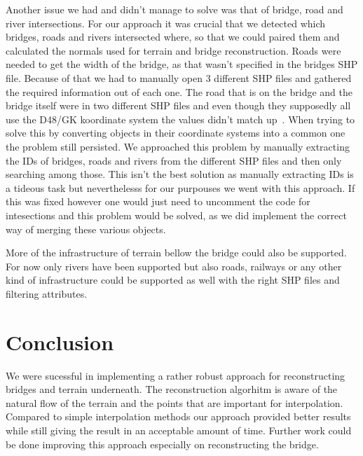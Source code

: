 \documentclass{egpubl-eurovis-star}
\begin{document}
Another issue we had and didn't manage to solve was that of bridge, road and river intersections.
For our approach it was crucial that we detected which bridges, roads and rivers intersected where, so that we could paired them and calculated the normals used for terrain and bridge reconstruction.
Roads were needed to get the width of the bridge, as that wasn't specified in the bridges SHP file.
Because of that we had to manually open 3 different SHP files and gathered the required information out of each one.
The road that is on the bridge and the bridge itself were in two different SHP files and even though they supposedly all use the D48/GK koordinate system the values didn't match up~\cite{d48gk}.
When trying to solve this by converting objects in their coordinate systems into a common one the problem still persisted.
We approached this problem by manually extracting the IDs of bridges, roads and rivers from the different SHP files and then only searching among those.
This isn't the best solution as manually extracting IDs is a tideous task but neverthelesss for our purpouses we went with this approach.
If this was fixed however one would just need to uncomment the code for intesections and this problem would be solved, as we did implement the correct way of merging these various objects.

More of the infrastructure of terrain bellow the bridge could also be supported.
For now only rivers have been supported but also roads, railways or any other kind of infrastructure could be supported as well with the right SHP files and filtering attributes.

\section{Conclusion}

We were sucessful in implementing a rather robust approach for reconstructing bridges and terrain underneath.
The reconstruction algorhitm is aware of the natural flow of the terrain and the points that are important for interpolation.
Compared to simple interpolation methods our approach provided better results while still giving the result in an acceptable amount of time.
Further work could be done improving this approach especially on reconstructing the bridge.

%



\end{document}
